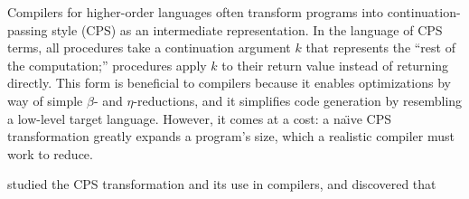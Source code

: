 \documentclass[11pt]{article}
\begin{document}
\thispagestyle{fancy}

Compilers for higher-order languages often transform programs into
continuation-passing style (CPS) as an intermediate representation. In the
language of CPS terms, all procedures take a continuation argument $k$
that represents the ``rest of the computation;'' procedures apply $k$ to their
return value instead of returning directly. This form is beneficial to
compilers because it enables optimizations by way of simple $\beta$- and
$\eta$-reductions, and it simplifies code generation by resembling a low-level
target language. However, it comes at a cost: a na\"{\i}ve CPS transformation
greatly expands a program's size, which a realistic compiler must work to
reduce.

\citet{Flanagan:1993fk} studied the CPS transformation and its use in
compilers, and discovered that





\end{document}
